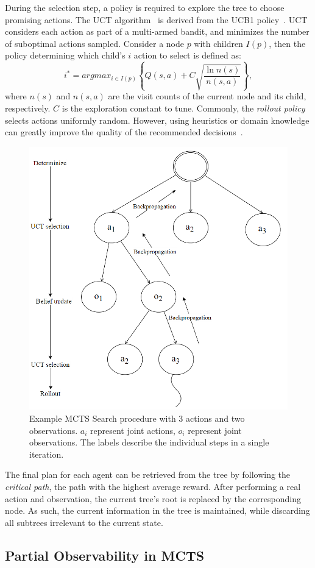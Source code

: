 \documentclass[conference]{IEEEtran}
\begin{document}
During the selection step, a policy is required to explore the tree to choose promising actions. The UCT algorithm~\cite{kocsis2006bandit} is derived from the UCB1 policy~\cite{auer2002using}. UCT considers each action as part of a multi-armed bandit, and minimizes the number of suboptimal actions sampled. Consider a node $p$ with children $I(p)$, then the policy determining which child's $i$ action to select is defined as:
\begin{equation}
\label{eq:uct}
i^* = argmax_{i \in I(p)}\left\{ Q(s,a) + C \sqrt{ \frac{\ln{n(s)}}{n(s, a)}}\right\},
\end{equation}
where $n(s)$ and $n(s, a)$ are the visit counts of the current node and its child, respectively. $C$ is the exploration constant to tune. Commonly, the \emph{rollout policy} selects actions uniformly random. However, using heuristics or domain knowledge can greatly improve the quality of the recommended decisions~\cite{browne2012survey}.

\begin{figure}
\begin{center}
 \includegraphics[width=.44\textwidth]{img/searchtree.png}
 \caption{Example MCTS Search procedure with 3 actions and two observations. $a_i$ represent joint actions, $o_i$ represent joint observations. The labels describe the individual steps in a single iteration.}\label{fig:searchtree}
\end{center}
\end{figure}

The final plan for each agent can be retrieved from the tree by following the \emph{critical path}, \ie the path with the highest average reward. After performing a real action and observation, the current tree's root is replaced by the corresponding node. As such, the current information in the tree is maintained, while discarding all subtrees irrelevant to the current state.

\subsection{Partial Observability in MCTS}
\label{sub:pomcts}
\end{document}
